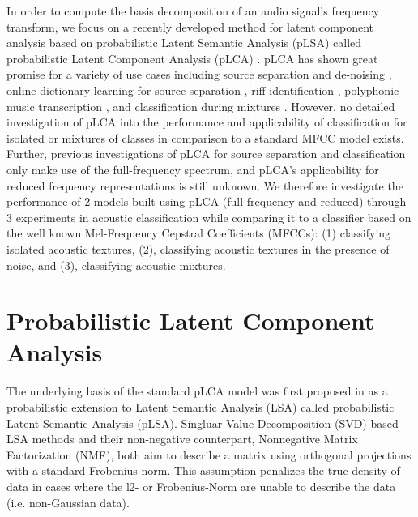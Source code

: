 \documentclass[a4paper,11pt,final]{ThesisStyle}
\begin{document}
In order to compute the basis decomposition of an audio signal's frequency transform, we focus on a recently developed method for latent component analysis based on probabilistic Latent Semantic Analysis (pLSA) \cite{Hofmann1999} called probabilistic Latent Component Analysis (pLCA) \cite{SmaragdisRajShashanka}.   pLCA has shown great promise for a variety of use cases including source separation and de-noising \cite{Smaragdis2007a,Smaragdis2007}, online dictionary learning for source separation \cite{Duan2012}, riff-identification \cite{Weiss2011}, polyphonic music transcription \cite{Benetos2011}, and classification during mixtures \cite{Nam2012}.  However, no detailed investigation of pLCA into the performance and applicability of classification for isolated or mixtures of classes in comparison to a standard MFCC model exists.  Further, previous investigations of pLCA for source separation and classification only make use of the full-frequency spectrum, and pLCA's applicability for reduced frequency representations is still unknown.  We therefore investigate the performance of 2 models built using pLCA (full-frequency and reduced) through 3 experiments in acoustic classification while comparing it to a classifier based on the well known Mel-Frequency Cepstral Coefficients (MFCCs): (1) classifying isolated acoustic textures, (2), classifying acoustic textures in the presence of noise, and (3), classifying acoustic mixtures.  


\section{Probabilistic Latent Component Analysis}
\label{sec:plca}

The underlying basis of the standard pLCA model was first proposed in \cite{Hofmann1999} as a probabilistic extension to Latent Semantic Analysis (LSA) called probabilistic Latent Semantic Analysis (pLSA).  Singluar Value Decomposition (SVD) based LSA methods and their non-negative counterpart, Nonnegative Matrix Factorization (NMF), both aim to describe a matrix using orthogonal projections with a standard Frobenius-norm.  This assumption penalizes the true density of data in cases where the l2- or Frobenius-Norm are unable to describe the data (i.e. non-Gaussian data).  
\end{document}
